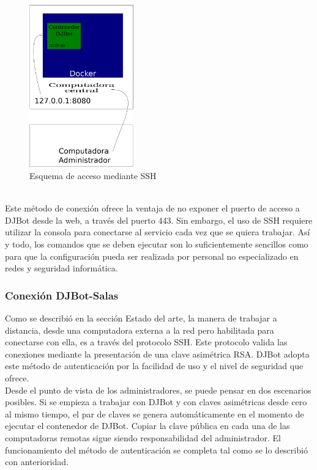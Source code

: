 \documentclass[a4paper,12pt]{article}
\begin{document}
\begin{figure}[htb]
\centering
\includegraphics[width=4.5cm]{./img/ssh.svg.png}
\caption{Esquema de acceso mediante SSH}
\end{figure} \\

Este método de conexión ofrece la ventaja de no exponer el puerto de acceso a DJBot desde la web, a través del puerto 443. Sin embargo, el uso de SSH requiere utilizar la consola para conectarse al servicio cada vez que se quiera trabajar. Así y todo, los comandos que se deben ejecutar son lo suficientemente sencillos como para que la configuración pueda ser realizada por personal no especializado en redes y seguridad informática.\\

\subsubsection{Conexión DJBot-Salas}
\label{sec:orgheadline25}

Como se describió en la sección Estado del arte, la manera de trabajar a distancia, desde una computadora externa a la red pero habilitada para conectarse con ella, es a través del protocolo SSH. Este protocolo valida las conexiones mediante la presentación de una clave asimétrica RSA. DJBot adopta este método de autenticación por la facilidad de uso y el nivel de seguridad que ofrece.\\

Desde el punto de vista de los administradores, se puede pensar en dos escenarios posibles. Si se empieza a trabajar con DJBot y con claves asimétricas desde cero al mismo tiempo, el par de claves se genera automáticamente en el momento de ejecutar el contenedor de DJBot. Copiar la clave pública en cada una de las computadoras remotas sigue siendo responsabilidad del administrador. El funcionamiento del método de autenticación se completa tal como se lo describió con anterioridad.\\
\end{document}
